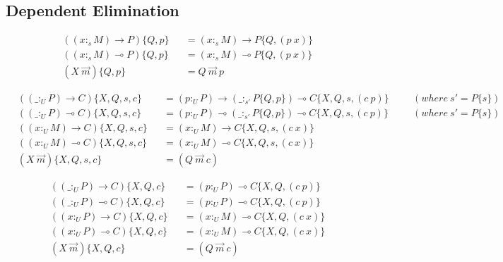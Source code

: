 \message{ !name(scratch.tex)}\documentclass{article}
\begin{document}
\subsection{Dependent Elimination}

\begin{align*}
  & ((x :_s M) \rightarrow P)\{Q,p\} && = (x :_s M) \rightarrow P\{Q,(p\ x)\} \\
  & ((x :_s M) \multimap P)\{Q,p\} && = (x :_s M) \multimap P\{Q,(p\ x)\} \\
  & (X\ \overrightarrow{m})\{Q,p\} && = Q\ \overrightarrow{m}\ p
\end{align*}

\begin{align*}
  & ((\_ :_U P) \rightarrow C)\{X,Q,s,c\} && = (p :_U P) \rightarrow (\_ :_{s'} P\{Q,p\}) \multimap C\{X,Q,s,(c\ p)\} &&& (where\ s' = P\{s\}) \\
  & ((\_ :_U P) \multimap C)\{X,Q,s,c\} && = (p :_U P) \multimap (\_ :_{s'} P\{Q,p\}) \multimap C\{X,Q,s,(c\ p)\} &&& (where\ s' = P\{s\})\\
  & ((x :_U M) \rightarrow C)\{X,Q,s,c\} && = (x :_U M) \rightarrow C\{X,Q,s,(c\ x)\} \\
  & ((x :_U M) \multimap C)\{X,Q,s,c\} && = (x :_U M) \multimap C\{X,Q,s,(c\ x)\} \\
  & (X\ \overrightarrow{m})\{X,Q,s,c\} && = (Q\ \overrightarrow{m}\ c)
\end{align*}

\begin{align*}
  & ((\_ :_U P) \rightarrow C)\{X,Q,c\} && = (p :_U P) \multimap C\{X,Q,(c\ p)\} \\
  & ((\_ :_U P) \multimap C)\{X,Q,c\} && = (p :_U P) \multimap C\{X,Q,(c\ p)\} \\
  & ((x :_U P) \rightarrow C)\{X,Q,c\} && = (x :_U M) \multimap C\{X,Q,(c\ x)\} \\
  & ((x :_U P) \multimap C)\{X,Q,c\} && = (x :_U M) \multimap C\{X,Q,(c\ x)\} \\
  & (X\ \overrightarrow{m})\{X,Q,c\} && = (Q\ \overrightarrow{m}\ c)
\end{align*}
\end{document}
